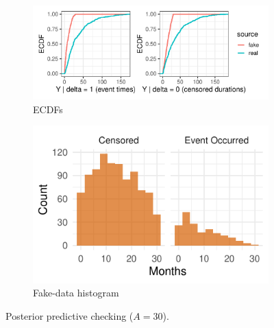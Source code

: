\begin{figure}[H]
\centering
\begin{subfigure}[t]{0.64\textwidth}
  \centering
  \includegraphics[width=\textwidth]{images/ppc_two_a30.pdf}  %
  \caption{{\small ECDFs}}
  \label{fig:ecdf-event_a30}
\end{subfigure}
\begin{subfigure}[t]{0.35\textwidth}
  \centering
  \includegraphics[width=\linewidth]{images/fake_duration_hist_a30.pdf}   %
  \caption{{\small Fake-data histogram}}
  \label{fig:fake-hist_a30}
\end{subfigure}
\caption{{\small Posterior predictive checking ($A=30$).}}
\label{fig:ppc-A30}
\end{figure}
